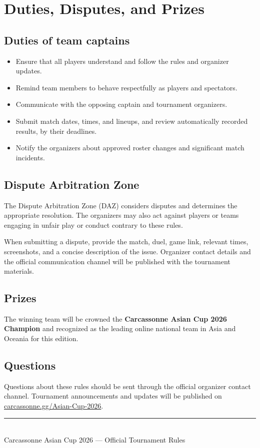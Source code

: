 \documentclass[10pt,a4paper]{article}
\newcommand{\term}[1]{\textbf{#1}}
\newcommand{\TournamentPage}{\href{https://carcassonne.gg/Asian-Cup-2026/}{carcassonne.gg/Asian-Cup-2026}}
\begin{document}
\section{Duties, Disputes, and Prizes}

\subsection{Duties of team captains}

\begin{itemize}
  \item Ensure that all players understand and follow the rules and organizer
        updates.
  \item Remind team members to behave respectfully as players and spectators.
  \item Communicate with the opposing captain and tournament organizers.
  \item Submit match dates, times, and lineups, and review automatically
        recorded results, by their deadlines.
  \item Notify the organizers about approved roster changes and significant
        match incidents.
\end{itemize}

\subsection{Dispute Arbitration Zone}

The Dispute Arbitration Zone (DAZ) considers disputes and determines the
appropriate resolution. The organizers may also act against players or teams
engaging in unfair play or conduct contrary to these rules.

When submitting a dispute, provide the match, duel, game link, relevant times,
screenshots, and a concise description of the issue. Organizer contact details
and the official communication channel will be published with the tournament
materials.

\subsection{Prizes}

The winning team will be crowned the \term{Carcassonne Asian Cup 2026 Champion}
and recognized as the leading online national team in Asia and Oceania for this
edition.

\subsection{Questions}

Questions about these rules should be sent through the official organizer
contact channel. Tournament announcements and updates will be published on
\TournamentPage.

\vfill
\begin{center}
  \color{AsianGold}\rule{0.7\textwidth}{1pt}\\[0.7em]
  \small\color{AsianGray}
  Carcassonne Asian Cup 2026 --- Official Tournament Rules
\end{center}
\end{document}
